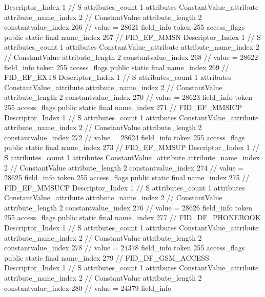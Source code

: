 {{{{{				Descriptor_Index	1		// S
				attributes_count	1
				attributes {
				ConstantValue_attribute {
					attribute_name_index	2		// ConstantValue
					attribute_length	2
					constantvalue_index	266		// value = 28621
				}
				}
			}
			field_info {
				token	255
				access_flags	public static final
				name_index	267		// FID_EF_MMSN
				Descriptor_Index	1		// S
				attributes_count	1
				attributes {
				ConstantValue_attribute {
					attribute_name_index	2		// ConstantValue
					attribute_length	2
					constantvalue_index	268		// value = 28622
				}
				}
			}
			field_info {
				token	255
				access_flags	public static final
				name_index	269		// FID_EF_EXT8
				Descriptor_Index	1		// S
				attributes_count	1
				attributes {
				ConstantValue_attribute {
					attribute_name_index	2		// ConstantValue
					attribute_length	2
					constantvalue_index	270		// value = 28623
				}
				}
			}
			field_info {
				token	255
				access_flags	public static final
				name_index	271		// FID_EF_MMSICP
				Descriptor_Index	1		// S
				attributes_count	1
				attributes {
				ConstantValue_attribute {
					attribute_name_index	2		// ConstantValue
					attribute_length	2
					constantvalue_index	272		// value = 28624
				}
				}
			}
			field_info {
				token	255
				access_flags	public static final
				name_index	273		// FID_EF_MMSUP
				Descriptor_Index	1		// S
				attributes_count	1
				attributes {
				ConstantValue_attribute {
					attribute_name_index	2		// ConstantValue
					attribute_length	2
					constantvalue_index	274		// value = 28625
				}
				}
			}
			field_info {
				token	255
				access_flags	public static final
				name_index	275		// FID_EF_MMSUCP
				Descriptor_Index	1		// S
				attributes_count	1
				attributes {
				ConstantValue_attribute {
					attribute_name_index	2		// ConstantValue
					attribute_length	2
					constantvalue_index	276		// value = 28626
				}
				}
			}
			field_info {
				token	255
				access_flags	public static final
				name_index	277		// FID_DF_PHONEBOOK
				Descriptor_Index	1		// S
				attributes_count	1
				attributes {
				ConstantValue_attribute {
					attribute_name_index	2		// ConstantValue
					attribute_length	2
					constantvalue_index	278		// value = 24378
				}
				}
			}
			field_info {
				token	255
				access_flags	public static final
				name_index	279		// FID_DF_GSM_ACCESS
				Descriptor_Index	1		// S
				attributes_count	1
				attributes {
				ConstantValue_attribute {
					attribute_name_index	2		// ConstantValue
					attribute_length	2
					constantvalue_index	280		// value = 24379
				}
				}
			}
			field_info {
}}}}}
